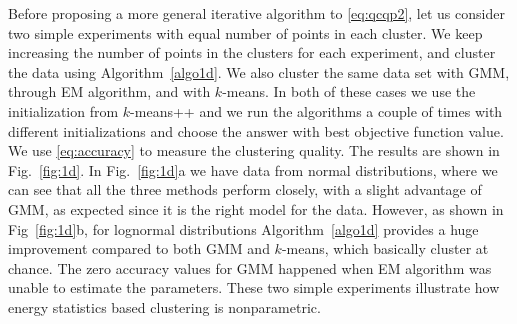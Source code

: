 \documentclass[aps,preprint,nofootinbib,floatfix]{revtex4-1}
\begin{document}
Before proposing a more general iterative algorithm to \eqref{eq:qcqp2},
let us consider two simple experiments with equal number of points
in each cluster. 
We keep increasing the number of points in the clusters for each experiment, 
and cluster the data using Algorithm~\ref{algo1d}. 
We also cluster the same data set
with GMM, through EM algorithm, and with $k$-means. In both of these
cases we use the initialization from $k$-means++ and we run the algorithms
a couple of times with different initializations and choose the answer
with best objective function value. We use \eqref{eq:accuracy} to measure
the clustering quality. The results are shown in 
Fig.~\ref{fig:1d}. In  Fig.~\ref{fig:1d}a 
we have data from normal distributions,
where we can see that all the three methods
perform closely, with a slight advantage of GMM, as expected since
it is the right model for the data. However, as shown in Fig~\ref{fig:1d}b,
for lognormal distributions Algorithm~\ref{algo1d} provides a huge improvement
compared to both GMM and $k$-means, which basically cluster at chance.
The zero accuracy values for GMM happened when EM algorithm was unable
to estimate the parameters. These two simple experiments illustrate
how energy statistics based clustering is nonparametric.
\end{document}
